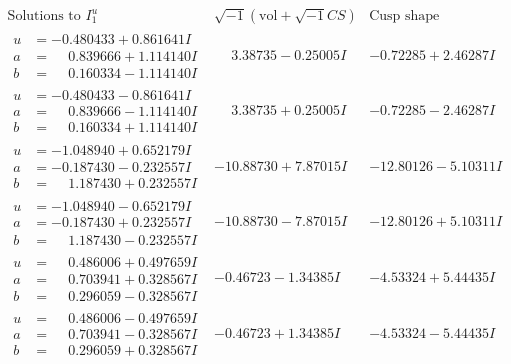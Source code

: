 \documentclass[1p]{elsarticle_modified}
\theoremstyle{definition}
\newcommand{\I}{\sqrt{-1}}
\begin{document}
$$\begin{array}{c|c|c}  
\text{Solutions to }I^u_{1}& \I (\text{vol} + \sqrt{-1}CS) & \text{Cusp shape}\\
 \hline 
\begin{aligned}
u &= -0.480433 + 0.861641 I \\
a &= \phantom{-}0.839666 + 1.114140 I \\
b &= \phantom{-}0.160334 - 1.114140 I\end{aligned}
 & \phantom{-}3.38735 - 0.25005 I & -0.72285 + 2.46287 I \\ \hline\begin{aligned}
u &= -0.480433 - 0.861641 I \\
a &= \phantom{-}0.839666 - 1.114140 I \\
b &= \phantom{-}0.160334 + 1.114140 I\end{aligned}
 & \phantom{-}3.38735 + 0.25005 I & -0.72285 - 2.46287 I \\ \hline\begin{aligned}
u &= -1.048940 + 0.652179 I \\
a &= -0.187430 - 0.232557 I \\
b &= \phantom{-}1.187430 + 0.232557 I\end{aligned}
 & -10.88730 + 7.87015 I & -12.80126 - 5.10311 I \\ \hline\begin{aligned}
u &= -1.048940 - 0.652179 I \\
a &= -0.187430 + 0.232557 I \\
b &= \phantom{-}1.187430 - 0.232557 I\end{aligned}
 & -10.88730 - 7.87015 I & -12.80126 + 5.10311 I \\ \hline\begin{aligned}
u &= \phantom{-}0.486006 + 0.497659 I \\
a &= \phantom{-}0.703941 + 0.328567 I \\
b &= \phantom{-}0.296059 - 0.328567 I\end{aligned}
 & -0.46723 - 1.34385 I & -4.53324 + 5.44435 I \\ \hline\begin{aligned}
u &= \phantom{-}0.486006 - 0.497659 I \\
a &= \phantom{-}0.703941 - 0.328567 I \\
b &= \phantom{-}0.296059 + 0.328567 I\end{aligned}
 & -0.46723 + 1.34385 I & -4.53324 - 5.44435 I \\ \hline\begin{aligned}

\end{aligned}
\end{array}$$
\end{document}
